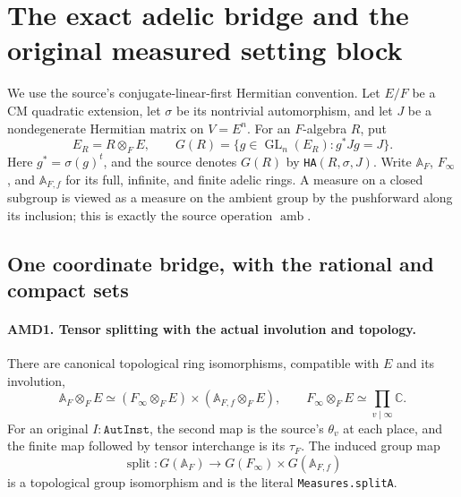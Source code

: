 \section{The exact adelic bridge and the original measured setting block}
\label{sec:adelic-measures-v48}


We use the source's conjugate-linear-first Hermitian convention.
Let \(E/F\) be a CM quadratic extension, let \(\sigma\) be its
nontrivial automorphism, and let \(J\) be a nondegenerate Hermitian
matrix on \(V=E^n\).  For an \(F\)-algebra \(R\), put
\[
 E_R=R\otimes_F E,\qquad
 G(R)=\{g\in\operatorname{GL}_n(E_R):g^*Jg=J\}.
 \tag{AMD.1}
\]
Here \(g^*=\sigma(g)^t\), and the source denotes \(G(R)\) by
\texttt{HA}\((R,\sigma,J)\).  Write \(\mathbb A_F\),
\(F_\infty\), and \(\mathbb A_{F,f}\) for its full, infinite,
and finite adelic rings.  A measure on a closed subgroup is viewed
as a measure on the ambient group by the pushforward along its
inclusion; this is exactly the source operation \(\operatorname{amb}\).

\subsection{One coordinate bridge, with the rational and compact sets}

\paragraph{AMD1. Tensor splitting with the actual involution and topology.}
\label{claim:AMD1}
There are canonical topological ring isomorphisms, compatible with
\(E\) and its involution,
\[
 \mathbb A_F\otimes_F E\simeq
 (F_\infty\otimes_F E)\times(\mathbb A_{F,f}\otimes_F E),
 \qquad
 F_\infty\otimes_F E\simeq\prod_{v\mid\infty}\mathbb C.
 \tag{AMD.2}
\]
For an original \(I:\texttt{AutInst}\), the second map is the
source's \(\theta_v\) at each place, and the finite map followed
by tensor interchange is its \(\tau_F\).  The induced group map
\[
 \operatorname{split}:G(\mathbb A_F)
       \longrightarrow G(F_\infty)\times G(\mathbb A_{F,f})
 \tag{AMD.3}
\]
is a topological group isomorphism and is the literal
\texttt{Measures.splitA}.

